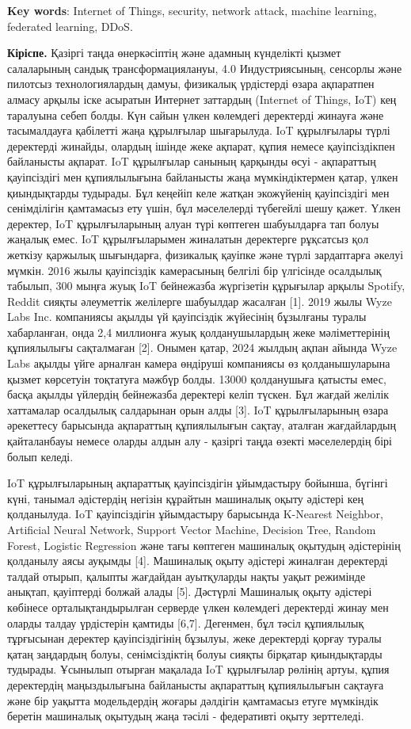 {\bfseries Key words}: Internet of Things, security, network attack,
machine learning, federated learning, DDoS.

{\bfseries Кіріспе.} Қазіргі таңда өнеркәсіптің және адамның күнделікті
қызмет салаларының сандық трансформациялануы, 4.0 Индустриясының,
сенсорлы және пилотсыз технологиялардың дамуы, физикалық үрдістерді
өзара ақпаратпен алмасу арқылы іске асыратын Интернет заттардың
(Internet of Things, IoT) кең таралуына себеп болды. Күн сайын үлкен
көлемдегі деректерді жинауға және тасымалдауға қабілетті жаңа құрылғылар
шығарылуда. IoT құрылғылары түрлі деректерді жинайды, олардың ішінде
жеке ақпарат, құпия немесе қауіпсіздікпен байланысты ақпарат. IoT
құрылғылар санының қарқынды өсуі - ақпараттың қауіпсіздігі мен
құпиялылығына байланысты жаңа мүмкіндіктермен қатар, үлкен қиындықтарды
тудырады. Бұл кеңейіп келе жатқан экожүйенің қауіпсіздігі мен
сенімділігін қамтамасыз ету үшін, бұл мәселелерді түбегейлі шешу қажет.
Үлкен деректер, IoT құрылғыларының алуан түрі көптеген шабуылдарға тап
болуы жаңалық емес. IoT құрылғыларымен жиналатын деректерге рұқсатсыз
қол жеткізу қаржылық шығындарға, физикалық қауіпке және түрлі
зардаптарға әкелуі мүмкін. 2016 жылы қауіпсіздік камерасының белгілі бір
үлгісінде осалдылық табылып, 300 мыңға жуық IoT бейнежазба жүргізетін
құрығылар арқылы Spotify, Reddit сияқты әлеуметтік желілерге шабуылдар
жасалған {[}1{]}. 2019 жылы Wyze Labs Inc. компаниясы ақылды үй
қауіпсіздік жүйесінің бұзылғаны туралы хабарланған, онда 2,4 миллионға
жуық қолданушылардың жеке мәліметтерінің құпиялылығы сақталмаған
{[}2{]}. Онымен қатар, 2024 жылдың ақпан айында Wyze Labs ақылды үйге
арналған камера өндіруші компаниясы өз қолданышуларына қызмет көрсетуін
тоқтатуға мәжбүр болды. 13000 қолданушыға қатысты емес, басқа ақылды
үйлердің бейнежазба деректері келіп түскен. Бұл жағдай желілік
хаттамалар осалдылық салдарынан орын алды {[}3{]}. IoT құрылғыларының
өзара әрекеттесу барысында ақпараттың құпиялылығын сақтау, аталған
жағдайлардың қайталанбауы немесе оларды алдын алу - қазіргі таңда өзекті
мәселелердің бірі болып келеді.

IoT құрылғыларының ақпараттық қауіпсіздігін ұйымдастыру бойынша, бүгінгі
күні, танымал әдістердің негізін құрайтын машиналық оқыту әдістері кең
қолданылуда. IoT қауіпсіздігін ұйымдастыру барысында K-Nearest Neighbor,
Artificial Neural Network, Support Vector Machine, Decision Tree, Random
Forest, Logistic Regression және тағы көптеген машиналық оқытудың
әдістерінің қолданылу аясы ауқымды {[}4{]}. Машиналық оқыту әдістері
жиналған деректерді талдай отырып, қалыпты жағдайдан ауытқуларды нақты
уақыт режимінде анықтап, қауіптерді болжай алады {[}5{]}. Дәстүрлі
Машиналық оқыту әдістері көбінесе орталықтандырылған серверде үлкен
көлемдегі деректерді жинау мен оларды талдау үрдістерін қамтиды
{[}6,7{]}. Дегенмен, бұл тәсіл құпиялылық тұрғысынан деректер
қауіпсіздігінің бұзылуы, жеке деректерді қорғау туралы қатаң заңдардың
болуы, сенімсіздіктің болуы сияқты бірқатар қиындықтарды тудырады.
Ұсынылып отырған мақалада IoT құрылғылар рөлінің артуы, құпия
деректердің маңыздылығына байланысты ақпараттың құпиялылығын сақтауға
және бір уақытта модельдердің жоғары дәлдігін қамтамасыз етуге мүмкіндік
беретін машиналық оқытудың жаңа тәсілі - федеративті оқыту зерттеледі.

